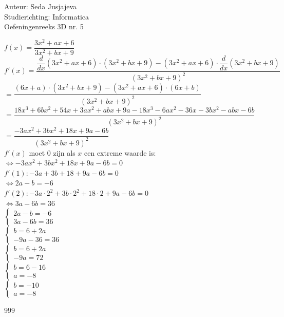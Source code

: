 \documentclass[a4paper]{article}
\begin{document}
\noindent \large Auteur: Seda Jusjajeva\\
\noindent \large Studierichting: Informatica\\
\noindent \large Oefeningenreeks 3D nr. 5 \\

\medskip

\normalsize


$f(x) = \dfrac{3x^2 + ax + 6}{3x^2 + bx + 9}$ \\

$f'(x) = \dfrac{\dfrac{d}{dx}(3x^2 + ax + 6)\cdot(3x^2 + bx + 9) - (3x^2 + ax + 6)\cdot\dfrac{d}{dx}(3x^2 + bx + 9)}{(3x^2 + bx + 9)^2}$ \\

$= \dfrac{(6x + a)\cdot(3x^2 + bx + 9) - (3x^2 + ax + 6)\cdot(6x + b)}{(3x^2 + bx + 9)^2}$ \\

$= \dfrac{18x^3 + 6bx^2 + 54x + 3ax^2 + abx + 9a - 18x^3 - 6ax^2 - 36x - 3bx^2 - abx - 6b}{(3x^{2} + bx + 9)^2} $ \\

$= \dfrac{-3ax^2 + 3bx^2 + 18x + 9a - 6b}{(3x^2 + bx + 9)^2}$ \\

$f'(x)$ moet $0$ zijn als $x$ een extreme waarde is: \\

$\Leftrightarrow-3ax^2 + 3bx^2 + 18x + 9a - 6b = 0$ \\

$f'(1): -3a + 3b + 18 + 9a - 6b = 0$ \\

$\Leftrightarrow 2a - b = -6$ \\

$f'(2): -3a\cdot2^2 + 3b\cdot2^2 + 18\cdot2 + 9a - 6b = 0$ \\

$\Leftrightarrow 3a - 6b = 36$ \\



$\left\{
\begin{array}{l}
2a - b = -6 \\
3a - 6b = 36
\end{array}
\right.$\\

$\left\{
\begin{array}{l}
b  =  6 + 2a \\
-9a - 36  =  36
\end{array}
\right.$\\

$\left\{
\begin{array}{l}
b = 6 + 2a \\
-9a = 72
\end{array}
\right.$\\

$\left\{
\begin{array}{l}
b = 6 - 16  \\
a = -8
\end{array}
\right.$\\

$\left\{
\begin{array}{l}
b = -10  \\
a = -8
\end{array}
\right.$\\


\begin{thebibliography}{999}
\end{thebibliography}
\end{document}
